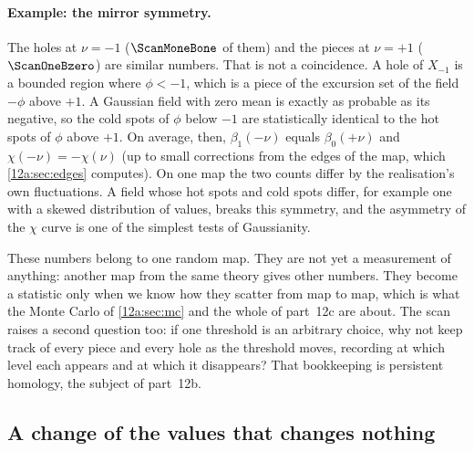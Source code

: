 \paragraph{Example: the mirror symmetry.} The holes at $\nu=-1$ ($\ScanMoneBone$ of them) and the pieces at
$\nu=+1$ ($\ScanOneBzero$) are similar numbers. That is not a coincidence. A hole of $X_{-1}$ is a bounded
region where $\phi<-1$, which is a piece of the excursion set of the field $-\phi$ above $+1$. A Gaussian
field with zero mean is exactly as probable as its negative, so the cold spots of $\phi$ below $-1$ are
statistically identical to the hot spots of $\phi$ above $+1$. On average, then, $\beta_1(-\nu)$ equals
$\beta_0(+\nu)$ and $\chi(-\nu)=-\chi(\nu)$ (up to small corrections from the edges of the map, which
\cref{12a:sec:edges} computes). On one map the two counts differ by the realisation's own fluctuations. A
field whose hot spots and cold spots differ, for example one with a skewed distribution of values, breaks
this symmetry, and the asymmetry of the $\chi$ curve is one of the simplest tests of Gaussianity.

These numbers belong to one random map. They are not yet a measurement of anything: another map from the
same theory gives other numbers. They become a statistic only when we know how they scatter from map to
map, which is what the Monte Carlo of \cref{12a:sec:mc} and the whole of part~12c are about. The scan raises
a second question too: if one threshold is an arbitrary choice, why not keep track of every piece and every
hole as the threshold moves, recording at which level each appears and at which it disappears? That
bookkeeping is persistent homology, the subject of part~12b.

\subsection{A change of the values that changes nothing}
\label{12a:sec:monotone}

